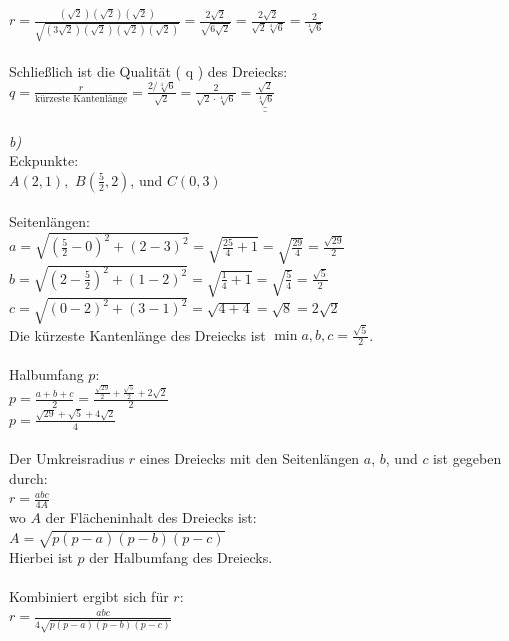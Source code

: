 \documentclass{article}
\begin{document}
$ r = \frac{(\sqrt{2})(\sqrt{2})(\sqrt{2})}{\sqrt{(3\sqrt{2})(\sqrt{2})(\sqrt{2})(\sqrt{2})}} = \frac{2\sqrt{2}}{\sqrt{6\sqrt{2}}} = \frac{2\sqrt{2}}{\sqrt{2}\sqrt[4]{6}} = \frac{2}{\sqrt[4]{6}} $
\\\\
Schließlich ist die Qualität ( q ) des Dreiecks:
\\
$ q = \frac{r}{\text{kürzeste Kantenlänge}} = \frac{2/\sqrt[4]{6}}{\sqrt{2}} = \frac{2}{\sqrt{2} \cdot \sqrt[4]{6}} = \underline{\underline{\frac{\sqrt{2}}{\sqrt[4]{6}}}} $
\\\\
\emph{b)}\\
Eckpunkte:
\\
$ A(2, 1),$ $B(\frac{5}{2}, 2)$, und $C(0, 3) $
\\\\
Seitenlängen:
\\
$ a = \sqrt{(\frac{5}{2}-0)^2 + (2-3)^2} = \sqrt{\frac{25}{4} + 1} = \sqrt{\frac{29}{4}} = \frac{\sqrt{29}}{2} $
\\
$ b = \sqrt{(2-\frac{5}{2})^2 + (1-2)^2} = \sqrt{\frac{1}{4} + 1} = \sqrt{\frac{5}{4}} = \frac{\sqrt{5}}{2} $
\\
$ c = \sqrt{(0-2)^2 + (3-1)^2} = \sqrt{4 + 4} = \sqrt{8} = 2\sqrt{2} $
\\
Die kürzeste Kantenlänge des Dreiecks ist $ \min{a, b, c} = \frac{\sqrt{5}}{2} $.
\\\\
Halbumfang $ p $:\\
$ p = \frac{a + b + c}{2} = \frac{\frac{\sqrt{29}}{2} + \frac{\sqrt{5}}{2} + 2\sqrt{2}}{2} $\\
$ p = \frac{\sqrt{29} + \sqrt{5} + 4\sqrt{2}}{4} $
\\\\
Der Umkreisradius \( r \) eines Dreiecks mit den Seitenlängen \( a \), \( b \), und \( c \) ist gegeben durch:\\
$ r = \frac{abc}{4A} $\\
wo \( A \) der Flächeninhalt des Dreiecks ist:\\
$ A = \sqrt{p(p - a)(p - b)(p - c)} $\\
Hierbei ist \( p \) der Halbumfang des Dreiecks.\\
\\
Kombiniert ergibt sich für \( r \):\\
$ r = \frac{abc}{4\sqrt{p(p - a)(p - b)(p - c)}} $
\end{document}
